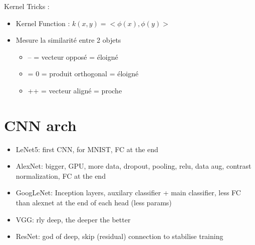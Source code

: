 \documentclass{article}
\theoremstyle{plain}%
\theoremstyle{definition}
\theoremstyle{remark}
\begin{document}
Kernel Tricks :
\begin{itemize}
    \item Kernel Function : $ k(x,y) = <\phi (x), \phi(y)> $
    \item Mesure la similarité entre 2 objets \begin{itemize}
        \item -- = vecteur opposé = éloigné
        \item = 0 = produit orthogonal = éloigné
        \item ++ = vecteur aligné = proche
    \end{itemize}
\end{itemize}



\section{CNN arch}
\begin{itemize}
    \item LeNet5: first CNN, for MNIST, FC at the end
    \item AlexNet: bigger, GPU, more data, dropout, pooling, relu, data aug, contrast normalization, FC at the end
    \item GoogLeNet: Inception layers, auxilary classifier + main classifier, less FC than alexnet at the end of each head (less params) 
    \item VGG: rly deep, the deeper the better
    \item ResNet: god of deep, skip (residual) connection to stabilise training
\end{itemize}
\end{document}
